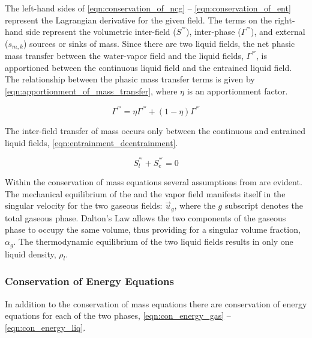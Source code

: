 The left-hand sides of \eqref{eqn:conservation_of_ncg} -- \eqref{eqn:conservation_of_ent} represent the Lagrangian derivative for the given field.
The terms on the right-hand side represent the volumetric inter-field ($S^{'''}$), inter-phase ($\Gamma^{'''}$),  and external ($s_{m,k}$) sources or sinks of mass.
Since there are two liquid fields, the net phasic mass transfer between the water-vapor field and the liquid fields, $\Gamma^{'''}$, is apportioned between the continuous liquid field and the entrained liquid field.
The relationship between the phasic mass transfer terms is given by \eqref{eqn:apportionment_of_mass_transfer}, where $\eta$ is an apportionment factor. 

\begin{equation}
\label{eqn:apportionment_of_mass_transfer}
\Gamma^{'''} = \eta \Gamma^{'''} + (1 - \eta)\Gamma^{'''}
\end{equation}

The inter-field transfer of mass occurs only between the continuous and entrained liquid fields, \eqref{eqn:entrainment_deentrainment}.

\begin{equation}
\label{eqn:entrainment_deentrainment}
S^{'''}_l + S^{'''}_e = 0
\end{equation}

Within the conservation of mass equations several assumptions from  are evident.
The mechanical equilibrium of the \ncg{} and the vapor field manifests itself in the singular velocity for the two gaseous fields: $\vec{u}_g$, where the $g$ subscript denotes the total gaseous phase.
Dalton's Law allows the two components of the gaseous phase to occupy the same volume, thus providing for a singular volume fraction, $\alpha_g$.
The thermodynamic equilibrium of the two liquid fields results in only one liquid density, $\rho_l$.

\subsubsection{Conservation of Energy Equations}
\label{subsubsect:energy_equations}

In addition to the conservation of mass equations there are conservation of energy equations for each of the two phases, \eqref{eqn:con_energy_gas} -- \eqref{eqn:con_energy_liq}.

